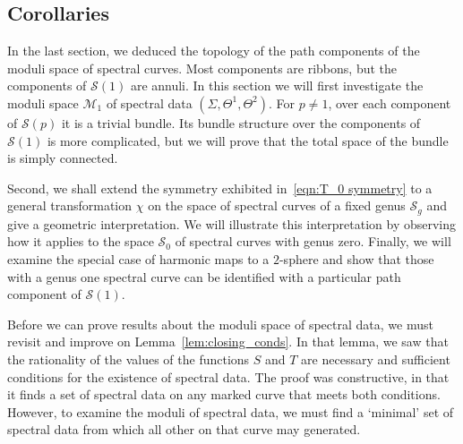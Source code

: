 \documentclass{article}
\begin{document}
\subsection{Corollaries}
\label{sec:Corollaries}

In the last section, we deduced the topology of the path components of the moduli space of spectral curves. Most components are ribbons, but the components of $\mathcal{S}(1)$ are annuli. In this section we will first investigate the moduli space $\mathcal{M}_1$ of spectral data $(\Sigma,\Theta^1,\Theta^2)$. For $p\neq 1$, over each component of $\mathcal{S}(p)$ it is a trivial bundle. Its bundle structure over the components of $\mathcal{S}(1)$ is more complicated, but we will prove that the total space of the bundle is simply connected.

Second, we shall extend the symmetry exhibited in~\eqref{eqn:T_0 symmetry} to a general transformation $\chi$ on the space of spectral curves of a fixed genus $\mathcal{S}_g$ and give a geometric interpretation. We will illustrate this interpretation by observing how it applies to the space $\mathcal{S}_0$ of spectral curves with genus zero. Finally, we will examine the special case of harmonic maps to a $2$-sphere and show that those with a genus one spectral curve can be identified with a particular path component of $\mathcal{S}(1)$.

Before we can prove results about the moduli space of spectral data, we must revisit and improve on Lemma~\ref{lem:closing_conds}. In that lemma, we saw that the rationality of the values of the functions $S$ and $T$ are necessary and sufficient conditions for the existence of spectral data. The proof was constructive, in that it finds a set of spectral data on any marked curve that meets both conditions. However, to examine the moduli of spectral data, we must find a `minimal' set of spectral data from which all other on that curve may generated.
\end{document}
